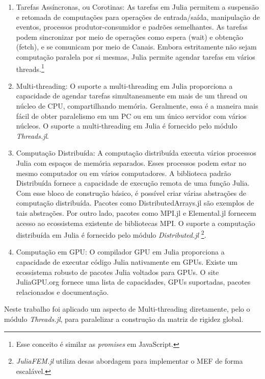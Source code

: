 \begin{enumerate}
    \item Tarefas Assíncronas, ou Corotinas:
    As tarefas em Julia permitem a suspensão e retomada de computações para operações de entrada/saída, manipulação de eventos, processos produtor-consumidor e padrões semelhantes. As tarefas podem sincronizar por meio de operações como espera (wait) e obtenção (fetch), e se comunicam por meio de Canais. Embora estritamente não sejam computação paralela por si mesmas, Julia permite agendar tarefas em vários threads.\footnote{Esse conceito é similar as \emph{promises} em JavaScript.}

    \item Multi-threading:
    O suporte a multi-threading em Julia proporciona a capacidade de agendar tarefas simultaneamente em mais de um thread ou núcleo de CPU, compartilhando memória. Geralmente, essa é a maneira mais fácil de obter paralelismo em um PC ou em um único servidor com vários núcleos. O suporte a multi-threading em Julia é fornecido pelo módulo \emph{Threads.jl}.

    \item Computação Distribuída:
    A computação distribuída executa vários processos Julia com espaços de memória separados. Esses processos podem estar no mesmo computador ou em vários computadores. A biblioteca padrão Distribuída fornece a capacidade de execução remota de uma função Julia. Com esse bloco de construção básico, é possível criar várias abstrações de computação distribuída. Pacotes como DistributedArrays.jl são exemplos de tais abstrações. Por outro lado, pacotes como MPI.jl e Elemental.jl fornecem acesso ao ecossistema existente de bibliotecas MPI. O suporte a computação distribuída em Julia é fornecido pelo módulo \emph{Distributed.jl} \footnote{\emph{JuliaFEM.jl} utiliza desas abordagem para implementar o MEF de forma escalável.}.

    \item Computação em GPU:
    O compilador GPU em Julia proporciona a capacidade de executar código Julia nativamente em GPUs. Existe um ecossistema robusto de pacotes Julia voltados para GPUs. O site JuliaGPU.org fornece uma lista de capacidades, GPUs suportadas, pacotes relacionados e documentação.
\end{enumerate}


Neste trabalho foi aplicado um aspecto de Multi-threading diretamente, pelo o módulo \emph{Threads.jl}, para paralelizar a construção da matriz de rigidez global.

